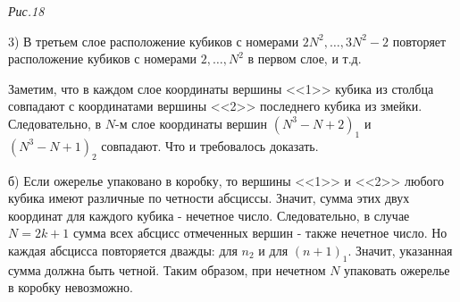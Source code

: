 \begin{flushleft}
\begin{multicols}{2}
\begin{center}
\end{center}
\textit{Рис.18}

3) В третьем слое расположение кубиков с номерами \(2N^2, \dots, 3N^2 - 2\) повторяет расположение кубиков с номерами \(2, \dots, N^2\) в первом слое, и т.д.

Заметим, что в каждом слое координаты вершины <<1>> кубика из столбца совпадают с координатами вершины <<2>> последнего кубика из змейки. Следовательно, в \(N\)-м слое координаты вершин \((N^3 - N + 2)_{1}\) и \((N^3 - N + 1)_{2}\) совпадают. Что и требовалось доказать.

б) Если ожерелье упаковано в коробку, то вершины <<1>> и <<2>> любого кубика имеют различные по четности абсциссы. Значит, сумма этих двух координат для каждого кубика - нечетное число. Следовательно, в случае \(N = 2k + 1\) сумма всех абсцисс отмеченных вершин - также нечетное число. Но каждая абсцисса повторяется дважды: для \(n_{2}\) и для \((n + 1)_{1}\). Значит, указанная сумма должна быть четной. Таким образом, при нечетном \(N\) упаковать ожерелье в коробку невозможно.
\end{multicols}
\end{flushleft}
